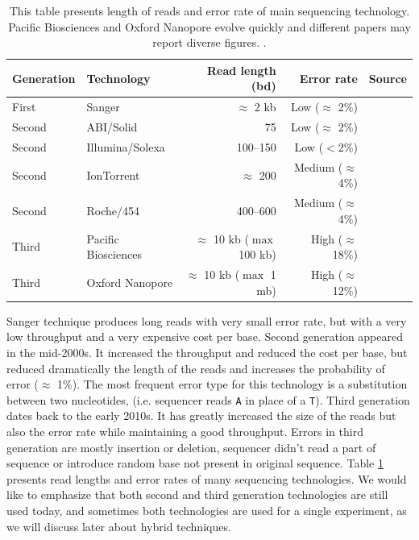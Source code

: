 \documentclass[./main.tex]{subfiles}
\begin{document}
\begin{table}[ht]
    \centering
    \begin{tabular}{ll|rr|l}
Generation & Technology          & Read length (bd)                 & Error rate             & Source                          \\ \hline
First      & Sanger              & $\approx$ 2 kb                   & Low ($\approx$ 2\%)    & \cite{seq_assembly_demystified} \\
Second     & ABI/Solid           & 75                               & Low ($\approx$ 2\%)    & \cite{seq_assembly_demystified} \\
Second     & Illumina/Solexa     & 100–150                          & Low ($<$2\%)             & \cite{seq_assembly_demystified} \\
Second     & IonTorrent          & $\approx$ 200                    & Medium ($\approx$ 4\%) & \cite{seq_assembly_demystified} \\
Second     & Roche/454           & 400–600                          & Medium ($\approx$ 4\%) & \cite{seq_assembly_demystified} \\
Third      & Pacific Biosciences & $\approx$ 10 kb ($\max$ 100 kb)  & High ($\approx$ 18\%)  & \cite{seq_assembly_demystified} \cite{longread_dark_matter} \\
Third      & Oxford Nanopore     & $\approx$ 10 kb ($\max$ 1 mb)    & High ($\approx$ 12\%)  & \cite{longread_dark_matter} \cite{nanopore_read_accuracy} \\
    \end{tabular}
    \caption{This table presents length of reads and error rate of main sequencing technology. Pacific Biosciences and Oxford Nanopore evolve quickly and different papers may report diverse figures.
    .}
    \label{intro:tab:technology_property}
\end{table}

Sanger technique produces long reads with very small error rate, but with a very low throughput and a very expensive cost per base. %
Second generation appeared in the mid-2000s. It increased the throughput and reduced the cost per base, but reduced dramatically the length of the reads and increases the probability of error ($\approx$ 1\%). %
The most frequent error type for this technology is a substitution between two nucleotides, (i.e. sequencer reads \texttt{A} in place of a \texttt{T}). %
Third generation dates back to the early 2010s. It has greatly increased the size of the reads but also the error rate while maintaining a good throughput. %
Errors in third generation are mostly insertion or deletion, sequencer didn't read a part of sequence or introduce random base not present in original sequence. Table \ref{intro:tab:technology_property} presents read lengths and error rates of many sequencing technologies. %
We would like to emphasize that both second and third generation technologies are still used today, and sometimes both technologies are used for a single experiment, as we will discuss later about hybrid techniques. %
\end{document}
